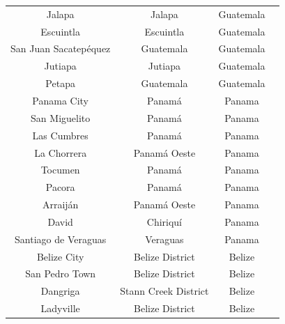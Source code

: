 \documentclass[letterpaper,12pt]{article}
\begin{document}
\begin{longtable}{c c c c }
Jalapa                   & Jalapa               & Guatemala   \\
Escuintla                & Escuintla            & Guatemala   \\
San Juan Sacatepéquez    & Guatemala            & Guatemala   \\
Jutiapa                  & Jutiapa              & Guatemala   \\
Petapa                   & Guatemala            & Guatemala   \\
Panama City              & Panamá               & Panama      \\
San Miguelito            & Panamá               & Panama      \\
Las Cumbres              & Panamá               & Panama      \\
La Chorrera              & Panamá Oeste         & Panama      \\
Tocumen                  & Panamá               & Panama      \\
Pacora                   & Panamá               & Panama      \\
Arraiján                 & Panamá Oeste         & Panama      \\
David                    & Chiriquí             & Panama      \\
Santiago de Veraguas     & Veraguas             & Panama      \\
Belize City              & Belize District      & Belize      \\
San Pedro Town           & Belize District      & Belize      \\
Dangriga                 & Stann Creek District & Belize      \\
Ladyville                & Belize District      & Belize     \\
\end{longtable}
\end{document}

